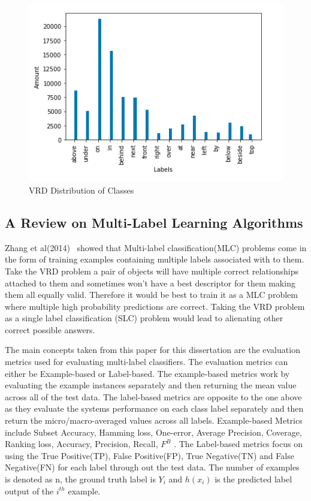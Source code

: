 \documentclass{csfyp}
\begin{document}
\begin{figure}[!htbp]
	\includegraphics[scale=0.60,center]{VRD_Labels.pdf}
	\caption{VRD Distribution of Classes}
\end{figure}

\subsection{A Review on Multi-Label Learning Algorithms}
Zhang et al(2014)~\cite{6471714} showed that Multi-label classification(MLC) problems come in the form of training examples containing multiple labels associated with to them. Take the VRD problem a pair of objects will have multiple correct relationships attached to them and sometimes won't have a best descriptor for them making them all equally valid. Therefore it would be best to train it as a MLC problem where multiple high probability predictions are correct. Taking the VRD problem as a single label classification (SLC) problem would lead to alienating other correct possible answers. 

The main concepts taken from this paper for this dissertation are the evaluation metrics used for evaluating multi-label classifiers. The evaluation metrics can either be Example-based or Label-based. The example-based metrics work by evaluating the example instances separately and then returning the mean value across all of the test data. The label-based metrics are opposite to the one above as they evaluate the systems performance on each class label separately and then return the micro/macro-averaged values across all labels. Example-based Metrics include Subset Accuracy, Hamming \Gls{loss}, One-error, Average Precision, Coverage, Ranking \Gls{loss}, Accuracy, Precision, Recall, $F^B$ . The Label-based metrics focus on using the True Positive(TP), False Positive(FP), True Negative(TN) and False Negative(FN) for each label through out the test data. The number of examples is denoted as n, the ground truth label is $Y_{i}$ and $h(x_{i})$ is the predicted label output of the $i^{th}$ example.
\end{document}
